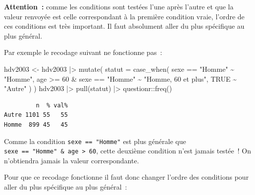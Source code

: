 \documentclass[
  letterpaper,
  DIV=11,
  numbers=noendperiod,
  oneside]{scrreprt}
\newenvironment{Shaded}{\begin{snugshade}}{\end{snugshade}}
\newcommand{\AttributeTok}[1]{\textcolor[rgb]{0.40,0.45,0.13}{#1}}
\newcommand{\ConstantTok}[1]{\textcolor[rgb]{0.56,0.35,0.01}{#1}}
\newcommand{\DecValTok}[1]{\textcolor[rgb]{0.68,0.00,0.00}{#1}}
\newcommand{\FunctionTok}[1]{\textcolor[rgb]{0.28,0.35,0.67}{#1}}
\newcommand{\NormalTok}[1]{\textcolor[rgb]{0.00,0.23,0.31}{#1}}
\newcommand{\OtherTok}[1]{\textcolor[rgb]{0.00,0.23,0.31}{#1}}
\newcommand{\SpecialCharTok}[1]{\textcolor[rgb]{0.37,0.37,0.37}{#1}}
\newcommand{\StringTok}[1]{\textcolor[rgb]{0.13,0.47,0.30}{#1}}
\begin{document}
\begin{tcolorbox}[enhanced jigsaw, colbacktitle=quarto-callout-important-color!10!white, opacityback=0, toprule=.15mm, colback=white, coltitle=black, bottomtitle=1mm, toptitle=1mm, titlerule=0mm, rightrule=.15mm, title=\textcolor{quarto-callout-important-color}{\faExclamation}\hspace{0.5em}{Important}, breakable, bottomrule=.15mm, opacitybacktitle=0.6, arc=.35mm, left=2mm, leftrule=.75mm, colframe=quarto-callout-important-color-frame]

\textbf{Attention~:} comme les conditions sont testées l'une après
l'autre et que la valeur renvoyée est celle correspondant à la première
condition vraie, l'ordre de ces conditions est très important. Il faut
absolument aller du plus spécifique au plus général.

Par exemple le recodage suivant ne fonctionne pas~:

\begin{Shaded}
\begin{Highlighting}[]
\NormalTok{hdv2003 }\OtherTok{\textless{}{-}}
\NormalTok{  hdv2003 }\SpecialCharTok{|\textgreater{}} 
  \FunctionTok{mutate}\NormalTok{(}
    \AttributeTok{statut =} \FunctionTok{case\_when}\NormalTok{(}
\NormalTok{      sexe }\SpecialCharTok{==} \StringTok{"Homme"} \SpecialCharTok{\textasciitilde{}} \StringTok{"Homme"}\NormalTok{,}
\NormalTok{      age }\SpecialCharTok{\textgreater{}=} \DecValTok{60} \SpecialCharTok{\&}\NormalTok{ sexe }\SpecialCharTok{==} \StringTok{"Homme"} \SpecialCharTok{\textasciitilde{}} \StringTok{"Homme, 60 et plus"}\NormalTok{,}
      \ConstantTok{TRUE} \SpecialCharTok{\textasciitilde{}} \StringTok{"Autre"}
\NormalTok{    )}
\NormalTok{  )}
\NormalTok{hdv2003 }\SpecialCharTok{|\textgreater{}} 
  \FunctionTok{pull}\NormalTok{(statut) }\SpecialCharTok{|\textgreater{}} 
\NormalTok{  questionr}\SpecialCharTok{::}\FunctionTok{freq}\NormalTok{()}
\end{Highlighting}
\end{Shaded}

\begin{verbatim}
         n  % val%
Autre 1101 55   55
Homme  899 45   45
\end{verbatim}

Comme la condition \texttt{sexe\ ==\ "Homme"} est plus générale que
\texttt{sexe\ ==\ "Homme"\ \&\ age\ \textgreater{}\ 60}, cette deuxième
condition n'est jamais testée~! On n'obtiendra jamais la valeur
correspondante.

Pour que ce recodage fonctionne il faut donc changer l'ordre des
conditions pour aller du plus spécifique au plus général~:


\end{tcolorbox}
\end{document}
